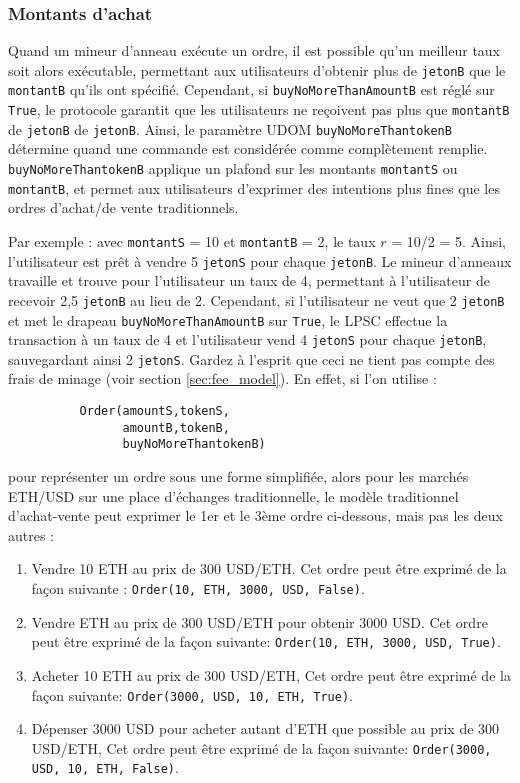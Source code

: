 \documentclass[UTF8,nofonts]{article}
\begin{document}
\begin{multicols}{2}
\subsubsection{Montants d'achat}

Quand un mineur d’anneau exécute un ordre, il est possible qu'un meilleur taux soit alors exécutable, permettant aux utilisateurs d'obtenir plus de \verb|jetonB| que le \verb|montantB| qu'ils ont spécifié. Cependant, si \verb|buyNoMoreThanAmountB| est réglé sur \verb|True|, le protocole garantit que les utilisateurs ne reçoivent pas plus que \verb|montantB| de \verb|jetonB| de \verb|jetonB|. Ainsi, le paramètre UDOM \verb|buyNoMoreThantokenB| détermine quand une commande est considérée comme complètement remplie. \verb|buyNoMoreThantokenB| applique un plafond sur les montants \verb|montantS| ou \verb|montantB|, et permet aux utilisateurs d'exprimer des intentions plus fines que les ordres d'achat/de vente traditionnels.

Par exemple : avec \verb|montantS| = 10 et \verb|montantB| = 2, le taux $r$ = 10/2 = 5. Ainsi, l'utilisateur est prêt à vendre 5 \verb|jetonS| pour chaque \verb|jetonB|. Le mineur d’anneaux travaille et trouve pour l'utilisateur un taux de 4, permettant à l'utilisateur de recevoir 2,5 \verb|jetonB| au lieu de 2. Cependant, si l'utilisateur ne veut que 2 \verb|jetonB| et met le drapeau \verb|buyNoMoreThanAmountB| sur \verb|True|, le LPSC effectue la transaction à un taux de 4 et l'utilisateur vend 4 \verb|jetonS| pour chaque \verb|jetonB|, sauvegardant ainsi 2 \verb|jetonS|. Gardez à l'esprit que ceci ne tient pas compte des frais de minage (voir section \ref{sec:fee_model}).
En effet, si l'on utilise :


\begin{verbatim}
	      Order(amountS,tokenS,
	            amountB,tokenB,
	            buyNoMoreThantokenB)
\end{verbatim}

pour représenter un ordre sous une forme simplifiée, alors pour les marchés ETH/USD sur une place d’échanges traditionnelle, le modèle traditionnel d'achat-vente peut exprimer le 1er et le 3ème ordre ci-dessous, mais pas les deux autres :

\begin{enumerate}
	\item Vendre 10 ETH au prix de 300 USD/ETH. Cet ordre peut être exprimé de la façon suivante : \verb|Order(10, ETH, 3000, USD, False)|.
	\item Vendre ETH au prix de 300 USD/ETH pour obtenir 3000 USD. Cet ordre peut être exprimé de la façon suivante: \verb|Order(10, ETH, 3000, USD, True)|.
	\item Acheter 10 ETH au prix de 300 USD/ETH, Cet ordre peut être exprimé de la façon suivante: \verb|Order(3000, USD, 10, ETH, True)|.
	\item Dépenser 3000 USD pour acheter autant d'ETH que possible au prix de 300 USD/ETH, Cet ordre peut être exprimé de la façon suivante: \verb|Order(3000, USD, 10, ETH, False)|.
\end{enumerate}




\end{multicols}
\end{document}
